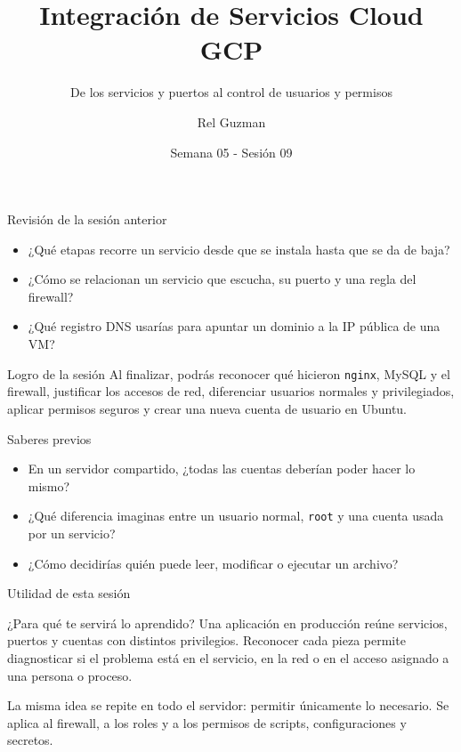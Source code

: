 \documentclass[aspectratio=169,10pt,c]{beamer}
\title{Integración de Servicios Cloud GCP}
\subtitle{De los servicios y puertos al control de usuarios y permisos}
\date{Semana 05 - Sesión 09}
\author{Rel Guzman}
\begin{document}
{\maketitle}

\begin{frame}{Revisión de la sesión anterior}
\begin{itemize}\setlength\itemsep{10pt}
  \item ¿Qué etapas recorre un servicio desde que se instala hasta que se da de baja?
  \item ¿Cómo se relacionan un servicio que escucha, su puerto y una regla del firewall?
  \item ¿Qué registro DNS usarías para apuntar un dominio a la IP pública de una VM?
\end{itemize}
\end{frame}

\begin{frame}[c]
\begin{block}{Logro de la sesión}
Al finalizar, podrás reconocer qué hicieron \texttt{nginx}, MySQL y el firewall, justificar los accesos de red, diferenciar usuarios normales y privilegiados, aplicar permisos seguros y crear una nueva cuenta de usuario en Ubuntu.
\end{block}
\end{frame}

\begin{frame}{Saberes previos}
\begin{itemize}\setlength\itemsep{10pt}
  \item En un servidor compartido, ¿todas las cuentas deberían poder hacer lo mismo?
  \item ¿Qué diferencia imaginas entre un usuario normal, \texttt{root} y una cuenta usada por un servicio?
  \item ¿Cómo decidirías quién puede leer, modificar o ejecutar un archivo?
\end{itemize}
\end{frame}

\begin{frame}{Utilidad de esta sesión}
\begin{block}{¿Para qué te servirá lo aprendido?}
Una aplicación en producción reúne servicios, puertos y cuentas con distintos privilegios. Reconocer cada pieza permite diagnosticar si el problema está en el servicio, en la red o en el acceso asignado a una persona o proceso.
\end{block}
\vspace{0.2cm}
\small La misma idea se repite en todo el servidor: permitir únicamente lo necesario. Se aplica al firewall, a los roles y a los permisos de scripts, configuraciones y secretos.
\end{frame}
\end{document}
